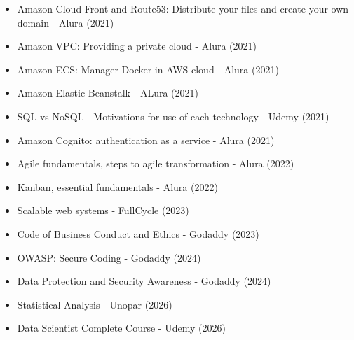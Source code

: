 \begin{itemize}
    \item Amazon Cloud Front and Route53: Distribute your files and create your own domain - Alura (2021)
    \item Amazon VPC: Providing a private cloud - Alura (2021)
    \item Amazon ECS: Manager Docker in AWS cloud - Alura (2021)
    \item Amazon Elastic Beanstalk - ALura (2021)
    \item SQL vs NoSQL - Motivations for use of each technology - Udemy (2021)
    \item Amazon Cognito: authentication as a service - Alura (2021)
    \item Agile fundamentals, steps to agile transformation - Alura (2022)
    \item Kanban, essential fundamentals - Alura (2022)
    \item Scalable web systems - FullCycle (2023)
    \item Code of Business Conduct and Ethics - Godaddy (2023)
    \item OWASP: Secure Coding - Godaddy (2024)
    \item Data Protection and Security Awareness - Godaddy (2024)
    \item Statistical Analysis - Unopar (2026)
    \item Data Scientist Complete Course - Udemy (2026)
\end{itemize}
